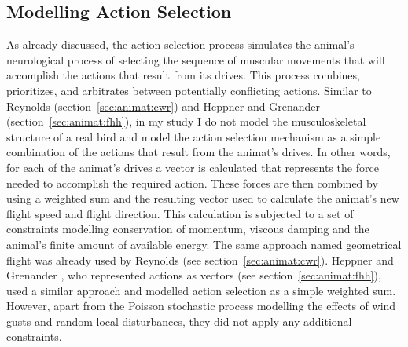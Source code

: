 \subsection{Modelling Action Selection}
As already discussed, the action selection process simulates the animal's neurological process of selecting the sequence of muscular movements that will accomplish the actions that result from its drives. This process combines, prioritizes, and arbitrates between potentially conflicting actions. Similar to Reynolds \cite{reynolds:1987,reynolds:1999} (section~\ref{sec:animat:cwr}) and Heppner and Grenander \cite{heppner:1990} (section~\ref{sec:animat:fhh}), in my study I do not model the musculoskeletal structure of a real bird and model the action selection mechanism as a simple combination of the actions that result from the animat's drives. In other words, for each of the animat's drives a vector is calculated that represents the force needed to accomplish the required action. These forces are then combined by using a weighted sum and the resulting vector used to calculate the animat's new flight speed and flight direction. This calculation is subjected to a set of constraints modelling conservation of momentum, viscous damping and the animal's finite amount of available energy. The same approach named geometrical flight was already used by Reynolds \cite{reynolds:1987,reynolds:1999} (see section~\ref{sec:animat:cwr}). Heppner and Grenander \cite{heppner:1990}, who represented actions as vectors (see section~\ref{sec:animat:fhh}), used a similar approach and modelled action selection as a simple weighted sum. However, apart from the Poisson stochastic process modelling the effects of wind gusts and random local disturbances, they did not apply any additional constraints. 

